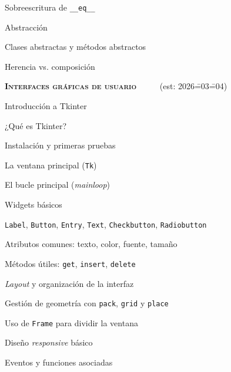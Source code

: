 \begin{longenum}
\begin{longenum}
\begin{longenum}
            \item Sobreescritura de \texttt{\_\_eq\_\_}
        \end{longenum}
        \item Abstracción
        \begin{longenum}
            \item Clases abstractas y métodos abstractos
        \end{longenum}
        \item Herencia vs. composición
    \end{longenum}
    \item \textbf{\textsc{Interfaces gráficas de usuario}} \ \ \ \ \ (est: 2026\==03\==04)
    \begin{longenum}
        \item Introducción a Tkinter
        \begin{longenum}
            \item ¿Qué es Tkinter?
            \item Instalación y primeras pruebas
            \item La ventana principal (\texttt{Tk})
            \item El bucle principal (\textit{mainloop})
        \end{longenum}
        \item Widgets básicos
        \begin{longenum}
            \item \texttt{Label}, \texttt{Button}, \texttt{Entry}, \texttt{Text}, \texttt{Checkbutton}, \texttt{Radiobutton}
            \item Atributos comunes: texto, color, fuente, tamaño
            \item Métodos útiles: \texttt{get}, \texttt{insert}, \texttt{delete}
        \end{longenum}
        \item \textit{Layout} y organización de la interfaz
        \begin{longenum}
            \item Gestión de geometría con \texttt{pack}, \texttt{grid} y \texttt{place}
            \item Uso de \texttt{Frame} para dividir la ventana
            \item Diseño \textit{responsive} básico
        \end{longenum}
        \item Eventos y funciones asociadas
        \begin{longenum}

\end{longenum}
\end{longenum}
\end{longenum}
